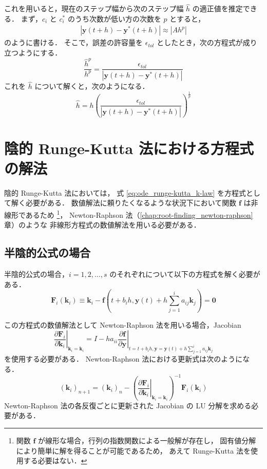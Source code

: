 これを用いると，現在のステップ幅から次のステップ幅 $\hat{h}$ の適正値を推定できる．
まず，$c_i$ と $c_i^*$ のうち次数が低い方の次数を $p$ とすると，
\begin{align}
    \left| \bm{y}(t + h) - \bm{y}^*(t + h) \right| \approx |Ah^p|
\end{align}
のように書ける．
そこで，誤差の許容量を $\epsilon_{tol}$ としたとき，次の方程式が成り立つようにする．
\begin{equation}
    \frac{\hat{h}^p}{h^p} = \frac{\epsilon_{tol}}{\left| \bm{y}(t + h) - \bm{y}^*(t + h) \right|}
\end{equation}
これを $\hat{h}$ について解くと，次のようになる．
\begin{equation}
    \hat{h} = h \left(\frac{\epsilon_{tol}}{\left| \bm{y}(t + h) - \bm{y}^*(t + h) \right|}\right)^{\frac{1}{p}}
\end{equation}

\section{陰的 Runge-Kutta 法における方程式の解法}

陰的 Runge-Kutta 法においては，
式 \eqref{eq:ode_runge-kutta_k-law} を方程式として解く必要がある．
数値解法に頼りたくなるような状況下において関数 $\bm{f}$ は非線形であるため
\footnote{関数 $\bm{f}$ が線形な場合，行列の指数関数による一般解が存在し，%
    固有値分解により簡単に解を得ることが可能であるため，%
    あえて Runge-Kutta 法を使用する必要はない．}，
Newton-Raphson 法（\ref{chap:root-finding_newton-raphson} 章）のような
非線形方程式の数値解法を用いる必要がある．

\subsection{半陰的公式の場合}

半陰的公式の場合，$i = 1, 2, \ldots, s$ のそれぞれについて以下の方程式を解く必要がある．
\begin{equation}
    \bm{F}_i(\bm{k}_i)
    \equiv \bm{k}_i - \bm{f}\left(t + b_i h, \bm{y}(t) + h \sum_{j = 1}^i a_{ij} \bm{k}_j \right)
    = \bm{0}
\end{equation}

この方程式の数値解法として
Newton-Raphson 法を用いる場合，Jacobian
\begin{equation}
    \left. \frac{\partial \bm{F}_i}{\partial \bm{k}_i} \right|_{\bm{k}_i = \bm{k}_i}
    = I - h a_{ii}
    \left. \frac{\partial \bm{f}}{\partial \bm{y}}
    \right|_{t = t + b_i h, \bm{y} = \bm{y}(t) + h \sum_{j = 1}^i a_{ij} \bm{k}_j}
\end{equation}
を使用する必要がある．
Newton-Raphson 法における更新式は次のようになる．
\begin{equation}
    (\bm{k}_i)_{n+1} = (\bm{k}_i)_{n}
    - \left(\left. \frac{\partial \bm{F}_i}{\partial \bm{k}_i} \right|_{\bm{k}_i = \bm{k}_i}\right)^{-1}
    \bm{F}_i(\bm{k}_i)
\end{equation}
Newton-Raphson 法の各反復ごとに更新された Jacobian の LU 分解を求める必要がある．

